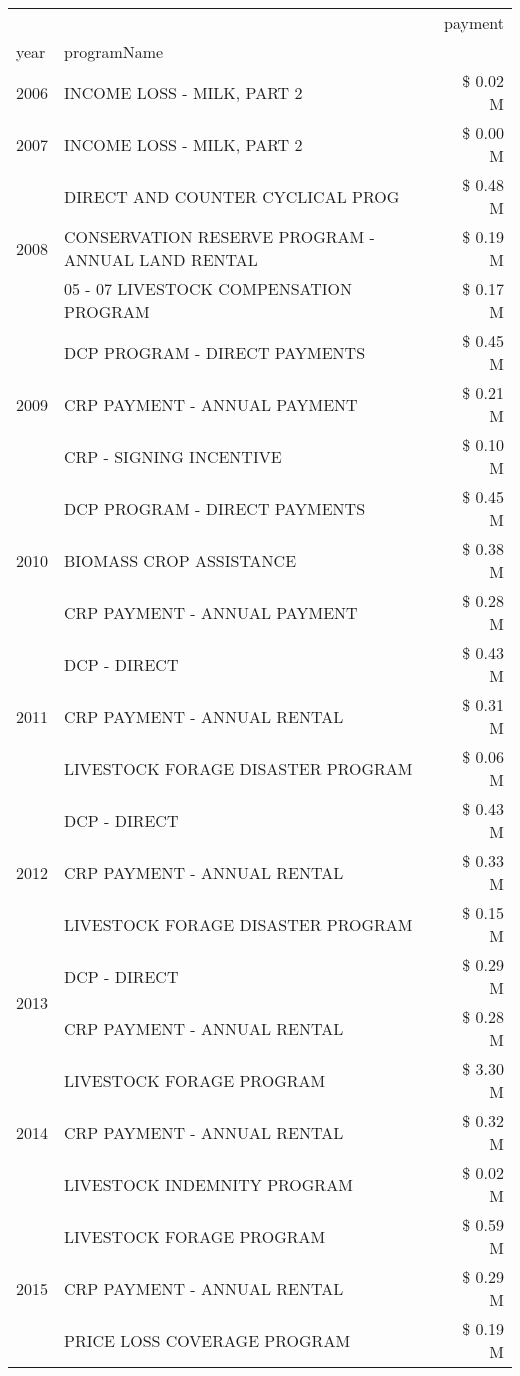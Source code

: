 \begin{tabular}{llr}
\toprule
 &  & payment \\
year & programName &  \\
\midrule
2006 & INCOME LOSS - MILK, PART 2 & \$ 0.02 M \\
\cline{1-3}
2007 & INCOME LOSS - MILK, PART 2 & \$ 0.00 M \\
\cline{1-3}
\multirow[t]{3}{*}{2008} & DIRECT AND COUNTER CYCLICAL PROG & \$ 0.48 M \\
 & CONSERVATION RESERVE PROGRAM - ANNUAL LAND RENTAL & \$ 0.19 M \\
 & 05 - 07 LIVESTOCK COMPENSATION PROGRAM & \$ 0.17 M \\
\cline{1-3}
\multirow[t]{3}{*}{2009} & DCP PROGRAM - DIRECT PAYMENTS & \$ 0.45 M \\
 & CRP PAYMENT - ANNUAL PAYMENT & \$ 0.21 M \\
 & CRP - SIGNING INCENTIVE & \$ 0.10 M \\
\cline{1-3}
\multirow[t]{3}{*}{2010} & DCP PROGRAM - DIRECT PAYMENTS & \$ 0.45 M \\
 & BIOMASS CROP ASSISTANCE & \$ 0.38 M \\
 & CRP PAYMENT - ANNUAL PAYMENT & \$ 0.28 M \\
\cline{1-3}
\multirow[t]{3}{*}{2011} & DCP - DIRECT & \$ 0.43 M \\
 & CRP PAYMENT - ANNUAL RENTAL & \$ 0.31 M \\
 & LIVESTOCK FORAGE DISASTER PROGRAM & \$ 0.06 M \\
\cline{1-3}
\multirow[t]{3}{*}{2012} & DCP - DIRECT & \$ 0.43 M \\
 & CRP PAYMENT - ANNUAL RENTAL & \$ 0.33 M \\
 & LIVESTOCK FORAGE DISASTER PROGRAM & \$ 0.15 M \\
\cline{1-3}
\multirow[t]{2}{*}{2013} & DCP - DIRECT & \$ 0.29 M \\
 & CRP PAYMENT - ANNUAL RENTAL & \$ 0.28 M \\
\cline{1-3}
\multirow[t]{3}{*}{2014} & LIVESTOCK FORAGE PROGRAM & \$ 3.30 M \\
 & CRP PAYMENT - ANNUAL RENTAL & \$ 0.32 M \\
 & LIVESTOCK INDEMNITY PROGRAM & \$ 0.02 M \\
\cline{1-3}
\multirow[t]{3}{*}{2015} & LIVESTOCK FORAGE PROGRAM & \$ 0.59 M \\
 & CRP PAYMENT - ANNUAL RENTAL & \$ 0.29 M \\
 & PRICE LOSS COVERAGE PROGRAM & \$ 0.19 M \\

\end{tabular}
